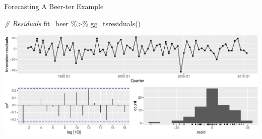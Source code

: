 \documentclass[
  ignorenonframetext,
]{beamer}
\newenvironment{Shaded}{\begin{snugshade}}{\end{snugshade}}
\newcommand{\CommentTok}[1]{\textcolor[rgb]{0.56,0.35,0.01}{\textit{#1}}}
\newcommand{\FunctionTok}[1]{\textcolor[rgb]{0.00,0.00,0.00}{#1}}
\newcommand{\NormalTok}[1]{#1}
\newcommand{\SpecialCharTok}[1]{\textcolor[rgb]{0.00,0.00,0.00}{#1}}
\begin{document}
\begin{frame}[fragile]{Forecasting \textbar{} \small A Beer-ter Example}
\protect\hypertarget{forecasting-a-beer-ter-example-2}{}
\tiny

\begin{Shaded}
\begin{Highlighting}[]
\CommentTok{\# Residuals}
\NormalTok{fit\_beer }\SpecialCharTok{\%\textgreater{}\%}
  \FunctionTok{gg\_tsresiduals}\NormalTok{()}
\end{Highlighting}
\end{Shaded}

\includegraphics{Time-series-regression-models_files/figure-beamer/unnamed-chunk-44-1.pdf}

\normalfont
\end{frame}
\end{document}
